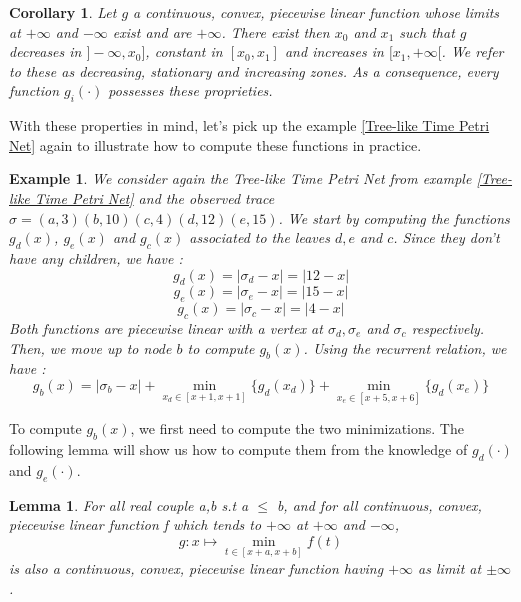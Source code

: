 \documentclass[conference]{IEEEtran}
\newtheorem{lemma}[theorem]{Lemma}
\newtheorem{corollary}{Corollary}
\newtheorem{example}{Example}
\begin{document}
\begin{corollary} 
    Let $g$ a continuous, convex, piecewise linear function whose limits 
    at $+\infty$ and $-\infty$ exist and are $+\infty$. There exist then $x_{0}$ and 
    $x_{1}$ such that $g$ decreases in $]-\infty,x_{0}]$, constant in $[x_{0},x_{1}]$ 
    and increases in $[x_{1},+\infty[$. We refer to these as decreasing, stationary and 
    increasing zones. As a consequence, every function $g_{i}(\cdot)$ possesses these 
    proprieties.
\end{corollary}

With these properties in mind, let's pick up the example \ref{Tree-like Time Petri Net} again to illustrate how to compute these functions in practice. 
\begin{example}
	We consider again the Tree-like Time Petri Net from example \ref{Tree-like Time Petri Net} and the observed trace $\sigma = (a,3)(b,10)(c,4)(d,12)(e,15)$.
	We start by computing the functions $g_{d}(x)$, $g_{e}(x)$ and $g_{c}(x)$ associated to the leaves $d,e$ and $c$.
	Since they don't have any children, we have :
	\[g_{d}(x) = |\sigma_{d}-x| = |12-x|\]
	\[g_{e}(x) = |\sigma_{e}-x| = |15-x|\]
	\[g_{c}(x) = |\sigma_{c}-x| = |4-x|\]
	Both functions are piecewise linear with a vertex at $\sigma_{d},\sigma_{e}$ and $\sigma_{c}$ respectively. 
	Then, we move up to node $b$ to compute $g_{b}(x)$.
	Using the recurrent relation, we have :
	\[g_{b}(x) = |\sigma_{b}-x| + \min_{x_{d}\in[x+1,x+1]}\{g_{d}(x_{d})\} + \min_{x_{e}\in[x+5,x+6]}\{g_{d}(x_{e})\}\]
\end{example}
To compute $g_{b}(x)$, we first need to compute the two minimizations. The following lemma will show us how to compute them from the knowledge of $g_{d}(\cdot)$ and $g_{e}(\cdot)$.
\begin{lemma} \label{lem:important} 
    For all real couple a,b s.t a $\leqslant$ b, and for all continuous, convex, 
    piecewise linear function f which tends to $+\infty$ at $+\infty$ and 
    $-\infty$, \[ g : x\mapsto \min_{t\in[x+a, x+b]}f(t) \] is also a continuous, 
    convex, piecewise linear function having $+\infty$ as limit at $\pm\infty$.
\end{lemma}
\end{document}
